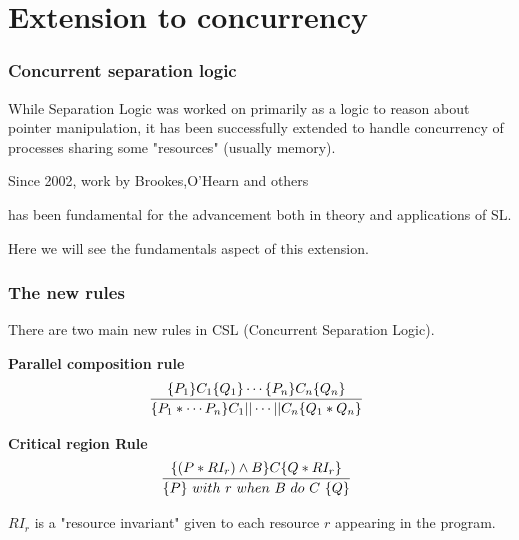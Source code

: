 \documentclass{beamer}
\begin{document}
    \section{Extension to concurrency}
    \begin{frame}
        \frametitle{Concurrent separation logic}
        
        \begin{card}
            
            While Separation Logic was worked on primarily as a logic
            to  reason about pointer manipulation, it has been successfully 
            extended to handle concurrency of processes sharing some "resources" (usually memory).
        \end{card}
        \begin{card}
        Since 2002, work by Brookes,O'Hearn and others \cite{brookes2016concurrent}

        has been fundamental for the advancement both in theory and applications of SL.

        Here we will see the fundamentals aspect of this extension.
        \end{card}
    \end{frame}
    \begin{frame}
        \frametitle{The new rules}
        There are two main new rules in CSL (Concurrent Separation Logic).
        
        \small
        \bigskip
        \textbf{Parallel composition rule}
        $$
        \infer[]{\{P_1 \ast \cdots P_n\}C_1 || \cdots || C_n\{Q_1 \ast Q_n\}}{\{P_1\}C_1\{Q_1\} \cdots \{P_n\}C_n\{Q_n\}}
        $$

        \pause

        \textbf{Critical region Rule}
        $$
        \infer[]{\{P\}\ with\ r\ when\ B\ do\ C\ \{Q\}}{\{(P \ast RI_r) \wedge B\}C\{Q \ast RI_r\}}
        $$

        $RI_r$ is a "resource invariant"  given to each resource $r$ appearing in the program.
    \end{frame}
\end{document}
